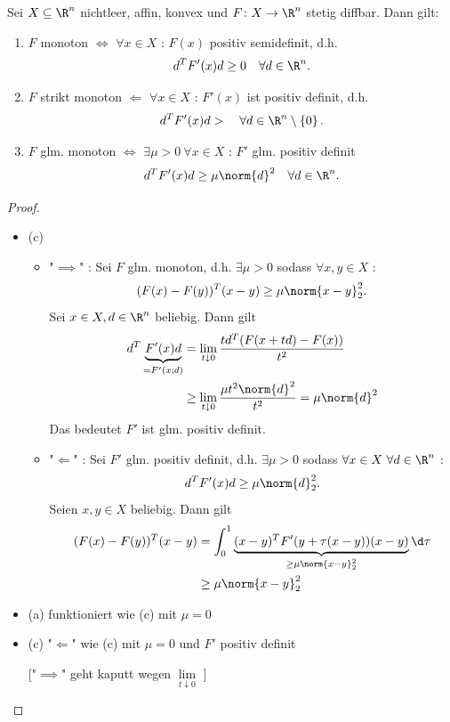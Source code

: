 \begin{satz}
\label{thm:monotonefunktionenunddefinitheit}
	Sei $X \subseteq \R^{n}$ nichtleer, affin, konvex und $F \colon X \rightarrow \R^{n} $ stetig diffbar. Dann gilt:
	\begin{enumerate}[label=(\alph{enumi})]
		\item $F$ monoton $\iff$ $\forall x \in X$ : $F(x)$ positiv semidefinit, d.h.
			\[
				d^{T}F'(x)d \geq 0 \quad \forall d \in \R^{n}
			.\] 
		\item $F$ strikt monoton $\Longleftarrow$ $\forall x \in X$ : $F'(x)$ ist positiv definit, d.h.
			\[
				d^{T}F'(x)d >  \quad \forall d \in \R^{n}\setminus \left\{ 0 \right\} 
			.\] 
		\item $F$ glm. monoton $\iff$ $\exists \mu > 0 ~ \forall x \in X$ : $F'$ glm. positiv definit
			\[
				d^{T} F'(x) d \geq \mu \norm{d} ^2 \quad \forall d \in \R^{n}
			.\]
	\end{enumerate}
\end{satz}

\begin{proof}
\label{thm:monotonefunktionenunddefinitheitbeweis}
\begin{itemize}
	\item (c)
		\begin{itemize}
			\item "$\implies$" : Sei $F$ glm. monoton, d.h. $\exists \mu > 0$ sodass $\forall x,y \in X$ : 
				\[
				(F(x)-F(y))^{T}(x-y) \geq \mu \norm{x-y} _{2}^2
				.\] 
				Sei $x \in X, d \in \R^{n}$ beliebig. Dann gilt
				\begin{align*}
					d^{T} \underbrace{F'(x)d}_{=F'(x;d)} &= \lim_{t \downarrow 0}  \frac{td^{T}(F(x+td) - F(x))}{t^2} \\
														 &\geq \lim_{t \downarrow 0}  \frac{\mu  t^2 \norm{d} ^2}{t^2} = \mu  \norm{d} ^2
				\end{align*}
				Das bedeutet $F'$ ist glm. positiv definit.

			\item "$\Longleftarrow$" : Sei $F'$ glm. positiv definit, d.h. $\exists \mu >0$ sodass $\forall x \in X ~ \forall d \in \R^{n}$ : 
				\[
					d^{T}F'(x)d \geq \mu \norm{d} _{2}^2
				.\] 
				Seien $x,y \in X$ beliebig. Dann gilt
				\begin{align*}
					(F(x)-F(y))^{T}(x-y) &= \int_{0}^{1} \underbrace{(x-y)^{T}F'(y+ \tau (x-y))(x-y)}_{\geq \mu \norm{x-y} _{2}^2} \d \tau \\
										 &\geq \mu  \norm{x-y} _{2}^2
				\end{align*}
		\end{itemize}
	\item (a) funktioniert wie (c) mit $\mu =0$
	\item (c) "$\Longleftarrow$" wie (c) mit $\mu =0$ und $F'$ positiv definit

		["$\implies$" geht kaputt wegen $\lim\limits_{t \downarrow 0}$ ]
\end{itemize}
\end{proof}

